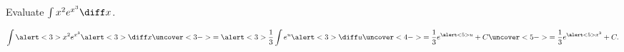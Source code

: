 \begin{frame}
\begin{example}[Example 8, p. 401]
Evaluate $\int x^2 e^{x^3} \diff x$.

\[
\int \alert<3>{x^2} e^{x^3} \alert<3>{\diff x} \uncover<3->{ = \alert<3>{\frac{1}{3}}\int e^u\alert<3>{\diff u}} \uncover<4->{ = \frac{1}{3}e^{\alert<5>{u}} + C} \uncover<5->{ = \frac{1}{3}e^{\alert<5>{x^3}} + C.}
\]
\end{example}
\end{frame}
